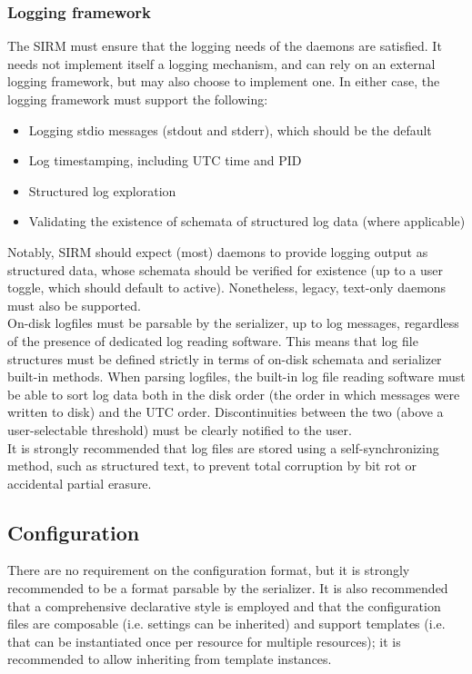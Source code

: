 \subsubsection{Logging framework}
The SIRM must ensure that the logging needs of the daemons are satisfied. It needs not implement itself a logging mechanism, and can rely on an external logging framework, but may also choose to implement one. In either case, the logging framework must support the following:
\begin{itemize}
	\item Logging stdio messages (stdout and stderr), which should be the default
	\item Log timestamping, including UTC time and PID
	\item Structured log exploration
	\item Validating the existence of schemata of structured log data (where applicable)
\end{itemize}
Notably, SIRM should expect (most) daemons to provide logging output as structured data, whose schemata should be verified for existence (up to a user toggle, which should default to active). Nonetheless, legacy, text-only daemons must also be supported.\\
On-disk logfiles must be parsable by the serializer, up to log messages, regardless of the presence of dedicated log reading software. This means that log file structures must be defined strictly in terms of on-disk schemata and serializer built-in methods. When parsing logfiles, the built-in log file reading software must be able to sort log data both in the disk order (the order in which messages were written to disk) and the UTC order. Discontinuities between the two (above a user-selectable threshold) must be clearly notified to the user.\\
It is strongly recommended that log files are stored using a self-synchronizing method, such as structured text, to prevent total corruption by bit rot or accidental partial erasure.
\subsection{Configuration}
There are no requirement on the configuration format, but it is strongly recommended to be a format parsable by the serializer. It is also recommended that a comprehensive declarative style is employed and that the configuration files are composable (i.e. settings can be inherited) and support templates (i.e. that can be instantiated once per resource for multiple resources); it is recommended to allow inheriting from template instances.